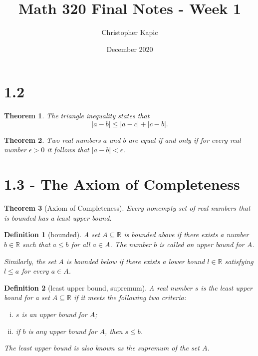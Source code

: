 \documentclass{article}
\title{Math 320 Final Notes - Week 1}
\author{Christopher Kapic}
\date{December 2020}
\newtheorem{definition}{Definition}
\newtheorem{theorem}{Theorem}
\begin{document}
\maketitle

\section*{1.2}
\begin{theorem}
    The triangle inequality states that \[|a-b|\leq |a-c|+|c-b|.\]
\end{theorem}

\begin{theorem}
    Two real numbers $a$ and $b$ are equal if and only if for every real number $\epsilon > 0$ it follows that $|a-b|<\epsilon$.
\end{theorem}

\section*{1.3 - The Axiom of Completeness}
\begin{theorem}[Axiom of Completeness]
    Every nonempty set of real numbers that is bounded has a least upper bound.
\end{theorem}

\begin{definition}[bounded]
    A set $A \subseteq \mathbb{R}$ is \textit{bounded above} if there exists a number $b \in \mathbb{R}$ such that $a \leq b$ for all $a \in A$. The number $b$ is called an \textit{upper bound} for $A$.

    Similarly, the set $A$ is \textit{bounded below} if there exists a \textit{lower bound} $l \in \mathbb{R}$ satisfying $l \leq a$ for every $a \in A$.
\end{definition}

\begin{definition}[least upper bound, supremum]
    A real number $s$ is the \textit{least upper bound} for a set $A \subseteq \mathbb{R}$ if it meets the following two criteria:
    \begin{enumerate}[(i)]
        \item $s$ is an upper bound for $A$;
        \item if $b$ is any upper bound for $A$, then $s \leq b$.
    \end{enumerate}
    The least upper bound is also known as the \textit{supremum} of the set $A$.
\end{definition}
\end{document}
